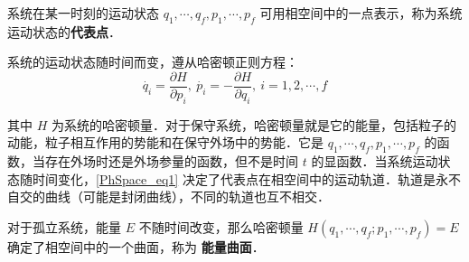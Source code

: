 系统在某一时刻的运动状态 $q_1,\cdots,q_f,p_1,\cdots,p_f$ 可用相空间中的一点表示，称为系统运动状态的\textbf{代表点}．

系统的运动状态随时间而变，遵从哈密顿正则方程：
\begin{equation}\label{PhSpace_eq1}
\dot{q_i}=\frac{\partial H}{\partial p_i},\ \dot{p_i}=-\frac{\partial H}{\partial q_i},\ i=1,2,\cdots,f
\end{equation}

其中 $H$ 为系统的哈密顿量．对于保守系统，哈密顿量就是它的能量，包括粒子的动能，粒子相互作用的势能和在保守外场中的势能．它是 $q_1,\cdots,q_f,p_1,\cdots,p_f$ 的函数，当存在外场时还是外场参量的函数，但不是时间 $t$ 的显函数．当系统运动状态随时间变化，\autoref{PhSpace_eq1} 决定了代表点在相空间中的运动轨道．轨道是永不自交的曲线（可能是封闭曲线），不同的轨道也互不相交．

对于孤立系统，能量 $E$ 不随时间改变，那么哈密顿量 $H(q_1,\cdots,q_f;p_1,\cdots,p_f)=E$ 确定了相空间中的一个曲面，称为 \textbf{能量曲面}．